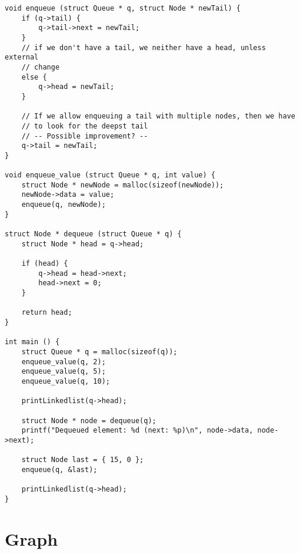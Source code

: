 \pagebreak
\begin{lstlisting}[caption={Naive implementation of a Queue}]
void enqueue (struct Queue * q, struct Node * newTail) {
    if (q->tail) {
        q->tail->next = newTail;
    }
    // if we don't have a tail, we neither have a head, unless external
    // change
    else {
        q->head = newTail;
    }

    // If we allow enqueuing a tail with multiple nodes, then we have
    // to look for the deepst tail
    // -- Possible improvement? --
    q->tail = newTail;
}

void enqueue_value (struct Queue * q, int value) {
    struct Node * newNode = malloc(sizeof(newNode));
    newNode->data = value;
    enqueue(q, newNode);
}

struct Node * dequeue (struct Queue * q) {
    struct Node * head = q->head;

    if (head) {
        q->head = head->next;
        head->next = 0;
    }

    return head;
}

int main () {
    struct Queue * q = malloc(sizeof(q));
    enqueue_value(q, 2);
    enqueue_value(q, 5);
    enqueue_value(q, 10);

    printLinkedlist(q->head);

    struct Node * node = dequeue(q);
    printf("Dequeued element: %d (next: %p)\n", node->data, node->next);

    struct Node last = { 15, 0 };
    enqueue(q, &last);

    printLinkedlist(q->head);
}
\end{lstlisting}


%
%
\section{Graph}



